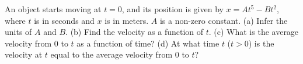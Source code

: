 An object starts moving at $t = 0$, and its position is given by $x =
A t^5 - B t^2$, where $t$ is in seconds and $x$ is in meters. $A$ is
a non-zero constant.
%
(a) Infer the units of $A$ and $B$.\hwendpart
%
(b) Find the velocity as a function of $t$.\answercheck\hwendpart
%
(c) What is the average velocity from $0$ to $t$ as a function of
time?\answercheck\hwendpart
%
(d) At what time $t$ ($t > 0$) is the velocity at $t$
equal to the average velocity from $0$ to $t$?\answercheck
